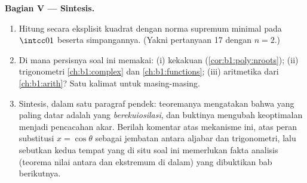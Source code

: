\begin{problem}
\medskip
\noindent\textbf{Bagian V --- Sintesis.}
\begin{enumerate}[resume]
  \item Hitung secara eksplisit kuadrat  dengan norma supremum
        minimal pada $\intcc01$ beserta simpangannya. (Yakni pertanyaan 17
        dengan $n = 2$.)
  \item Di mana persisnya soal ini memakai: (i) kekakuan
         (\cref{cor:b1:poly:nroots}); (ii)
        trigonometri \cref{ch:b1:complex} dan
        \cref{ch:b1:functions}; (iii) aritmetika  dari \cref{ch:b1:arith}? Satu kalimat untuk masing-masing.
  \item Sintesis, dalam satu paragraf pendek: teoremanya mengatakan bahwa
         yang paling datar adalah yang
        \emph{berekuiosilasi}, dan buktinya mengubah keoptimalan
        menjadi pencacahan akar. Berilah komentar atas mekanisme ini, atas
        peran substitusi $x = \cos\theta$ sebagai jembatan
        antara aljabar dan trigonometri, lalu sebutkan kedua
        tempat yang di situ soal ini memerlukan fakta analisis (teorema nilai antara dan
        ekstremum di dalam) yang dibuktikan bab berikutnya.

\end{enumerate}
\end{problem}

